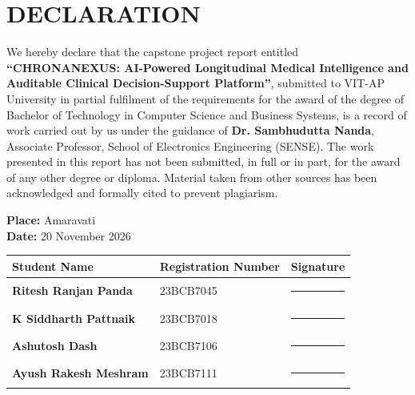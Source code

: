 \chapter*{DECLARATION}

We hereby declare that the capstone project report entitled \textbf{``CHRONANEXUS: AI-Powered Longitudinal Medical Intelligence and Auditable Clinical Decision-Support Platform''}, submitted to VIT-AP University in partial fulfilment of the requirements for the award of the degree of Bachelor of Technology in Computer Science and Business Systems, is a record of work carried out by us under the guidance of \textbf{Dr. Sambhudutta Nanda}, Associate Professor, School of Electronics Engineering (SENSE). The work presented in this report has not been submitted, in full or in part, for the award of any other degree or diploma. Material taken from other sources has been acknowledged and formally cited to prevent plagiarism.

\vspace{1.5cm}

\noindent
\textbf{Place:} Amaravati\\
\textbf{Date:} 20 November 2026

\vspace{1.2cm}

\noindent
\begin{tabular}{p{} p{} p{}}
\toprule
\textbf{Student Name} & \textbf{Registration Number} & \textbf{Signature} \\
\midrule
\textbf{Ritesh Ranjan Panda} & 23BCB7045 & \rule{4cm}{0.4pt} \\[0.5cm]
\textbf{K Siddharth Pattnaik} & 23BCB7018 & \rule{4cm}{0.4pt} \\[0.5cm]
\textbf{Ashutosh Dash} & 23BCB7106 & \rule{4cm}{0.4pt} \\[0.5cm]
\textbf{Ayush Rakesh Meshram} & 23BCB7111 & \rule{4cm}{0.4pt} \\
\bottomrule
\end{tabular}
